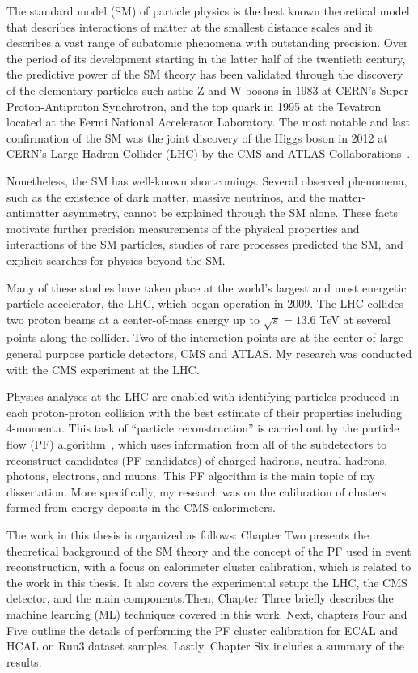 
The standard model (SM) of particle physics is the best known theoretical model that describes interactions of matter at the smallest distance scales and it describes a vast range of subatomic phenomena
with outstanding precision.
Over the period of its development starting in the latter half of the twentieth century, the predictive power of the SM theory has been validated through the discovery of the elementary particles
such asthe Z and W bosons in 1983 at CERN's Super Proton-Antiproton Synchrotron, and the top quark in 1995 at the Tevatron located at the Fermi National Accelerator Laboratory.
The most notable and last confirmation of the SM was the joint discovery of the Higgs boson in 2012 at CERN's Large Hadron Collider (LHC) by the CMS
and ATLAS Collaborations~\cite{ATLAS:2012yve,CMS:2012qbp,CMS:2013btf}.

Nonetheless, the SM has well-known shortcomings. Several observed phenomena, such as the existence of dark matter, massive neutrinos, and the matter-antimatter asymmetry, cannot be explained through the SM alone.
These facts motivate further precision measurements of the physical properties and interactions of the SM particles, studies of rare processes predicted the SM, and explicit searches for physics beyond the SM.

Many of these studies have taken place at the world's largest and most energetic particle accelerator, the LHC, which began operation in 2009.
The LHC collides two proton beams at a center-of-mass energy up to $\sqrt{s}=13.6$ TeV at several points along the collider.
Two of the interaction points are at the center of large general purpose particle detectors, CMS and ATLAS. My research was conducted with the CMS experiment at the LHC.

Physics analyses at the LHC are enabled with identifying particles produced in each proton-proton collision with the best estimate of their properties including 4-momenta.
This task of ``particle reconstruction'' is carried out by the particle flow (PF) algorithm~\cite{PF}, which uses information from all of the subdetectors to reconstruct candidates
(PF candidates) of charged hadrons, neutral hadrons, photons, electrons, and muons.
This PF algorithm is the main topic of my dissertation.
More specifically, my research was on the calibration of clusters formed from energy deposits in the CMS calorimeters.

The work in this thesis is organized as follows:
Chapter Two presents the theoretical background of the SM theory and the concept of the PF used in event reconstruction, with a focus on calorimeter cluster calibration, which is related to the work in this thesis.
It also covers the experimental setup: the LHC, the CMS detector, and the main components.Then, Chapter Three briefly describes	the machine learning (ML) techniques covered in	this work.
Next, chapters Four and Five outline the details of performing the PF cluster calibration for ECAL and HCAL on Run3 dataset samples.
Lastly, Chapter Six includes a summary of the results.
